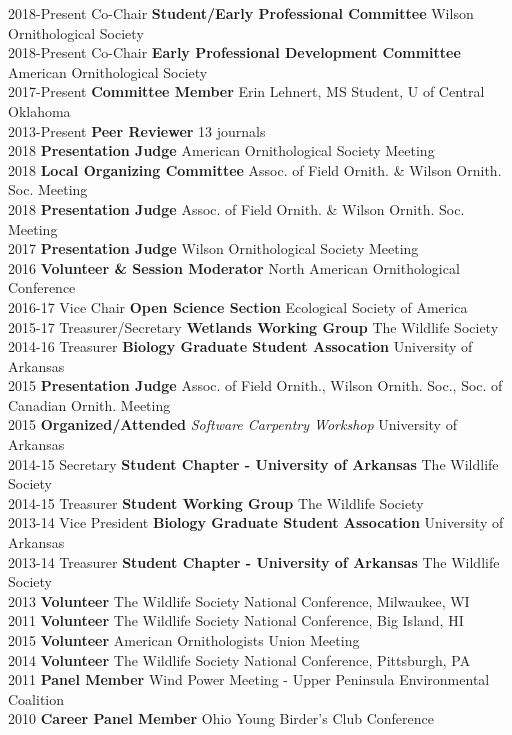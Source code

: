 \documentclass[]{article}
\begin{document}
2018-Present Co-Chair \textbf{Student/Early Professional Committee}
Wilson Ornithological Society\\
2018-Present Co-Chair \textbf{Early Professional Development Committee}
American Ornithological Society\\
2017-Present \textbf{Committee Member} Erin Lehnert, MS Student, U of
Central Oklahoma\\
2013-Present \textbf{Peer Reviewer} 13 journals\\
2018 \textbf{Presentation Judge} American Ornithological Society
Meeting\\
2018 \textbf{Local Organizing Committee} Assoc. of Field Ornith. \&
Wilson Ornith. Soc. Meeting\\
2018 \textbf{Presentation Judge} Assoc. of Field Ornith. \& Wilson
Ornith. Soc. Meeting\\
2017 \textbf{Presentation Judge} Wilson Ornithological Society Meeting\\
2016 \textbf{Volunteer \& Session Moderator} North American
Ornithological Conference\\
2016-17 Vice Chair \textbf{Open Science Section} Ecological Society of
America\\
2015-17 Treasurer/Secretary \textbf{Wetlands Working Group} The Wildlife
Society\\
2014-16 Treasurer \textbf{Biology Graduate Student Assocation}
University of Arkansas\\
2015 \textbf{Presentation Judge} Assoc. of Field Ornith., Wilson Ornith.
Soc., Soc. of Canadian Ornith. Meeting\\
2015 \textbf{Organized/Attended} \emph{Software Carpentry Workshop}
University of Arkansas\\
2014-15 Secretary \textbf{Student Chapter - University of Arkansas} The
Wildlife Society\\
2014-15 Treasurer \textbf{Student Working Group} The Wildlife Society\\
2013-14 Vice President \textbf{Biology Graduate Student Assocation}
University of Arkansas\\
2013-14 Treasurer \textbf{Student Chapter - University of Arkansas} The
Wildlife Society\\
2013 \textbf{Volunteer} The Wildlife Society National Conference,
Milwaukee, WI\\
2011 \textbf{Volunteer} The Wildlife Society National Conference, Big
Island, HI\\
2015 \textbf{Volunteer} American Ornithologists Union Meeting\\
2014 \textbf{Volunteer} The Wildlife Society National Conference,
Pittsburgh, PA\\
2011 \textbf{Panel Member} Wind Power Meeting - Upper Peninsula
Environmental Coalition\\
2010 \textbf{Career Panel Member} Ohio Young Birder's Club Conference
\end{document}
